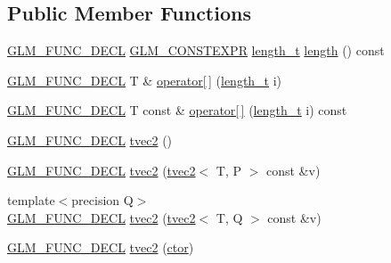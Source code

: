 \subsection*{Public Member Functions}
\begin{DoxyCompactItemize}
\item 
\hyperlink{setup_8hpp_ab2d052de21a70539923e9bcbf6e83a51}{G\+L\+M\+\_\+\+F\+U\+N\+C\+\_\+\+D\+E\+CL} \hyperlink{setup_8hpp_a08b807947b47031d3a511f03f89645ad}{G\+L\+M\+\_\+\+C\+O\+N\+S\+T\+E\+X\+PR} \hyperlink{namespaceglm_a090a0de2260835bee80e71a702492ed9}{length\+\_\+t} \hyperlink{structglm_1_1detail_1_1tvec2_a93bcefc352f5a828d0692d7a0d4b3188}{length} () const
\item 
\hyperlink{setup_8hpp_ab2d052de21a70539923e9bcbf6e83a51}{G\+L\+M\+\_\+\+F\+U\+N\+C\+\_\+\+D\+E\+CL} T \& \hyperlink{structglm_1_1detail_1_1tvec2_acae6c81d07fce7bf13265a8a1d9fb24c}{operator\mbox{[}$\,$\mbox{]}} (\hyperlink{namespaceglm_a090a0de2260835bee80e71a702492ed9}{length\+\_\+t} i)
\item 
\hyperlink{setup_8hpp_ab2d052de21a70539923e9bcbf6e83a51}{G\+L\+M\+\_\+\+F\+U\+N\+C\+\_\+\+D\+E\+CL} T const  \& \hyperlink{structglm_1_1detail_1_1tvec2_a6ee1b2b995ab50042c68447c41db3a62}{operator\mbox{[}$\,$\mbox{]}} (\hyperlink{namespaceglm_a090a0de2260835bee80e71a702492ed9}{length\+\_\+t} i) const
\item 
\hyperlink{setup_8hpp_ab2d052de21a70539923e9bcbf6e83a51}{G\+L\+M\+\_\+\+F\+U\+N\+C\+\_\+\+D\+E\+CL} \hyperlink{structglm_1_1detail_1_1tvec2_a94b97e78eeef245abdc326056faa36a5}{tvec2} ()
\item 
\hyperlink{setup_8hpp_ab2d052de21a70539923e9bcbf6e83a51}{G\+L\+M\+\_\+\+F\+U\+N\+C\+\_\+\+D\+E\+CL} \hyperlink{structglm_1_1detail_1_1tvec2_a764076eb651c2fd732122e24bb882dbf}{tvec2} (\hyperlink{structglm_1_1detail_1_1tvec2}{tvec2}$<$ T, P $>$ const \&v)
\item 
{\footnotesize template$<$precision Q$>$ }\\\hyperlink{setup_8hpp_ab2d052de21a70539923e9bcbf6e83a51}{G\+L\+M\+\_\+\+F\+U\+N\+C\+\_\+\+D\+E\+CL} \hyperlink{structglm_1_1detail_1_1tvec2_a6a255de24aea35da27b4f41579b3d56f}{tvec2} (\hyperlink{structglm_1_1detail_1_1tvec2}{tvec2}$<$ T, Q $>$ const \&v)
\item 
\hyperlink{setup_8hpp_ab2d052de21a70539923e9bcbf6e83a51}{G\+L\+M\+\_\+\+F\+U\+N\+C\+\_\+\+D\+E\+CL} \hyperlink{structglm_1_1detail_1_1tvec2_af5e5e83f86c18552e4e1045d74f676ad}{tvec2} (\hyperlink{structglm_1_1detail_1_1tvec2_aa0bba0616f425fbd3fb5756aed326386}{ctor})
\item 

\end{DoxyCompactItemize}
